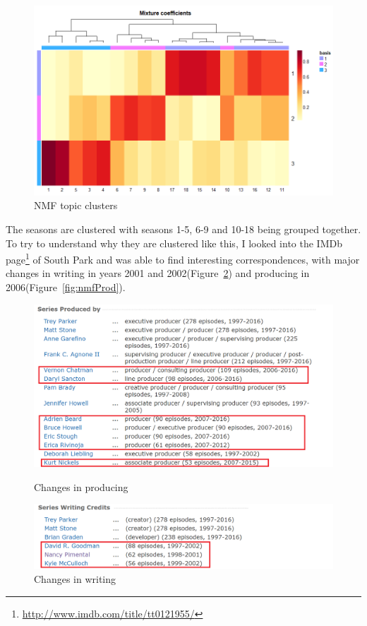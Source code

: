 \documentclass[10pt,a4paper]{article}
\begin{document}
	
	\begin{figure}[h]
	\centering
	\includegraphics[scale=0.5]{images/NMF_coefmap.png}
	\caption{NMF topic clusters}
	\label{fig:nmf}
	\end{figure}
	
	The seasons are clustered with seasons 1-5, 6-9 and 10-18 being grouped together. To try to understand why they are clustered like this, I looked into the IMDb page\footnote{\url{http://www.imdb.com/title/tt0121955/}} of South Park and was able to find interesting correspondences, with major changes in writing in years 2001 and 2002(Figure~\ref{fig:nmfWriters}) and producing in 2006(Figure~\ref{fig:nmfProd}).
	
		\begin{figure}[!h]
  \centering
  \begin{minipage}[b]{0.45\textwidth}
   \includegraphics[width=\textwidth]{images/producer.png}
	\caption{Changes in producing}
	\label{fig:nmfProd}
  \end{minipage}
  \hfill
  \begin{minipage}[b]{0.45\textwidth}
   \includegraphics[width=\textwidth]{images/writers.png}
	\caption{Changes in writing}
	\label{fig:nmfWriters}
  \end{minipage}
\end{figure}		
	
\end{document}
